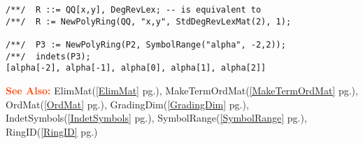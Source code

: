 \documentclass[a4paper]{mybook}
\newenvironment{command}{}{} %
\newcommand\SeeAlso{\par\textcolor{OrangeRed}{\textbf{\large See Also: }}}
\begin{document}
\begin{command}
\begin{Verbatim}[label=example, rulecolor=\color{PineGreen}, frame=single]
/**/  R ::= QQ[x,y], DegRevLex; -- is equivalent to
/**/  R := NewPolyRing(QQ, "x,y", StdDegRevLexMat(2), 1);

/**/  P3 := NewPolyRing(P2, SymbolRange("alpha", -2,2));
/**/  indets(P3);
[alpha[-2], alpha[-1], alpha[0], alpha[1], alpha[2]]
\end{Verbatim}


\SeeAlso %
  ElimMat(\ref{ElimMat} pg.\pageref{ElimMat}), 
    MakeTermOrdMat(\ref{MakeTermOrdMat} pg.\pageref{MakeTermOrdMat}), 
    OrdMat(\ref{OrdMat} pg.\pageref{OrdMat}), 
    GradingDim(\ref{GradingDim} pg.\pageref{GradingDim}), 
    IndetSymbols(\ref{IndetSymbols} pg.\pageref{IndetSymbols}), 
    SymbolRange(\ref{SymbolRange} pg.\pageref{SymbolRange}), 
    RingID(\ref{RingID} pg.\pageref{RingID})
\end{command} %
\end{document}
